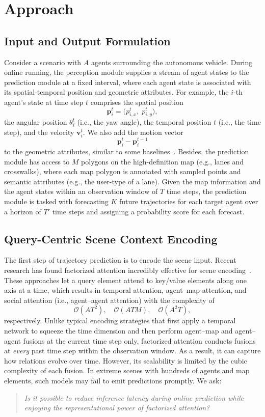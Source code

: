 
\section{Approach}
\label{sec:approach}

\subsection{Input and Output Formulation}
Consider a scenario with $A$ agents surrounding the autonomous vehicle.  During online running, the perception module supplies a stream of agent states to the prediction module at a fixed interval, where each agent state is associated with its spatial-temporal position and geometric attributes.  For example, the $i$-th agent's state at time step $t$ comprises the spatial position
\[
\mathbf{p}_i^t = \bigl(p_{i,x}^t,\;p_{i,y}^t\bigr),
\]
the angular position $\theta_i^t$ (i.e., the yaw angle), the temporal position $t$ (i.e., the time step), and the velocity $\mathbf{v}_i^t$.  We also add the motion vector
\[
\mathbf{p}_i^t - \mathbf{p}_i^{t-1}
\]
to the geometric attributes, similar to some baselines~\cite{LaneGCN,HiVT}.  Besides, the prediction module has access to $M$ polygons on the high-definition map (e.g., lanes and crosswalks), where each map polygon is annotated with sampled points and semantic attributes (e.g., the user-type of a lane).  Given the map information and the agent states within an observation window of $T$ time steps, the prediction module is tasked with forecasting $K$ future trajectories for each target agent over a horizon of $T'$ time steps and assigning a probability score for each forecast.

\subsection{Query-Centric Scene Context Encoding}
The first step of trajectory prediction is to encode the scene input.  Recent research has found factorized attention incredibly effective for scene encoding~\cite{SceneTransformer,Wayformer,HiVT}.  These approaches let a query element attend to key/value elements along one axis at a time, which results in temporal attention, agent–map attention, and social attention (i.e., agent–agent attention) with the complexity of
\[
\mathcal{O}(AT^2),\quad
\mathcal{O}(ATM),\quad
\mathcal{O}(A^2T),
\]
respectively.  Unlike typical encoding strategies that first apply a temporal network to squeeze the time dimension and then perform agent–map and agent–agent fusions at the current time step only, factorized attention conducts fusions at \emph{every} past time step within the observation window.  As a result, it can capture how relations evolve over time.  However, its scalability is limited by the cubic complexity of each fusion.  In extreme scenes with hundreds of agents and map elements, such models may fail to emit predictions promptly.  We ask:
\begin{quote}
  \emph{Is it possible to reduce inference latency during online prediction while enjoying the representational power of factorized attention?}
\end{quote}

